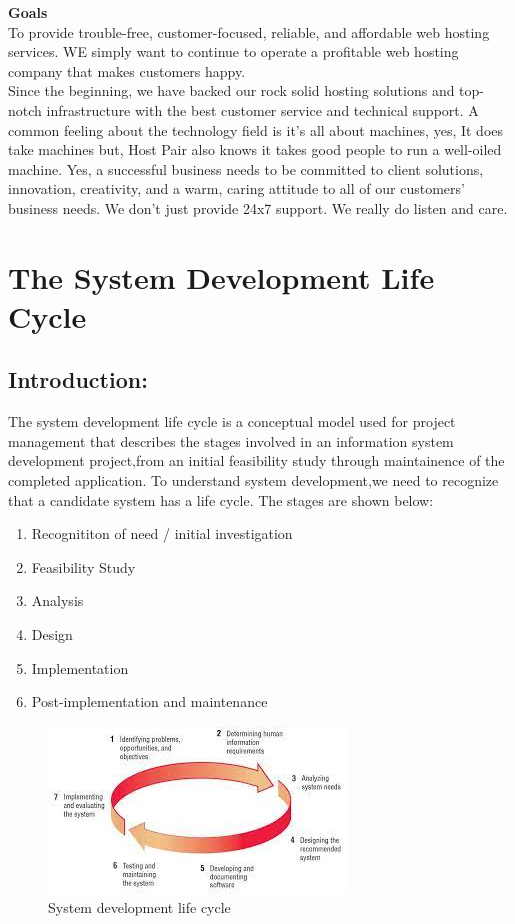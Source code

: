 \documentclass[a4paper,12pt]{report}
\begin{document}
\newpage
\textbf{Goals}\\
To provide trouble-free, customer-focused, reliable, and affordable web hosting services. WE simply want
to continue to operate a profitable web hosting company that makes customers happy. \\Since the
beginning, we have backed our rock solid hosting solutions and top-notch infrastructure with the best
customer service and technical support. A common feeling about the technology field is it's all about
machines, yes, It does take machines but, Host Pair also knows it takes good people to run a well-oiled
machine. Yes, a successful business needs to be committed to client solutions, innovation, creativity, and
a warm, caring attitude to all of our customers' business needs. We don't just provide 24x7 support. We
really do listen and care.













\newpage
\chapter{The System Development Life Cycle }
\section{Introduction:}
The system development life cycle is a conceptual model used for project management that describes the stages involved in an information system development project,from an initial feasibility study through maintainence of the completed application. To understand system development,we need to recognize that a candidate system has a life cycle. The stages are shown below:
\begin{enumerate}
	\item Recognititon of need / initial investigation
	\item	Feasibility Study
	\item	Analysis
	\item Design
	\item	Implementation
	\item	Post-implementation and maintenance   
	\end{enumerate}
\begin{figure}[h]
	\centering
	\includegraphics[width=0.7\linewidth]{fig-1;chap-2}
	\caption{System development life cycle}
	\label{fig:fig-1chap-2}
\end{figure}
\end{document}
